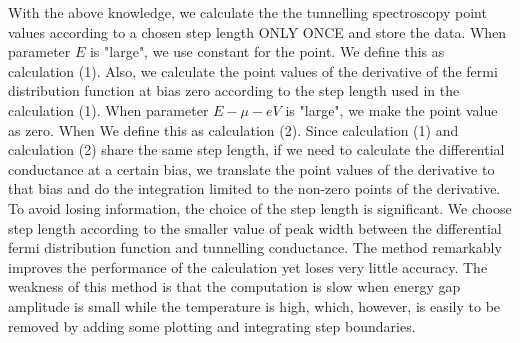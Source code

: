 With the above knowledge, we calculate the the tunnelling spectroscopy point values according to a chosen step length ONLY ONCE and store the data. When parameter $E$ is "large", we use constant for the point. We define this as calculation (1).
Also, we calculate the point values of the derivative of the fermi distribution function at bias zero according to the step length used in the calculation (1). When parameter $E-\mu-eV$ is "large", we make the point value as zero. When We define this as calculation (2).
Since calculation (1) and calculation (2) share the same step length, if we need to calculate the differential conductance at a certain bias, we translate the point values of the derivative to that bias and do the integration limited to the non-zero points of the derivative.
To avoid losing information, the choice of the step length is significant. We choose step length according to the smaller value of peak width between the differential fermi distribution function and tunnelling conductance.
The method remarkably improves the performance of the calculation yet loses very little accuracy. The weakness of this method is that the computation is slow when energy gap amplitude is small while the temperature is high, which, however, is easily to be removed by adding some plotting and integrating step boundaries.

